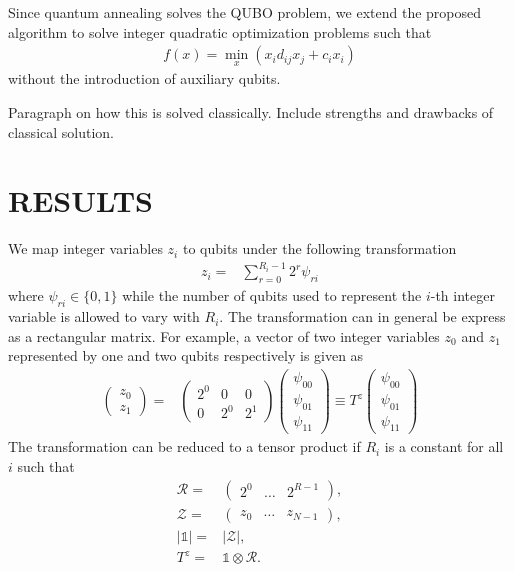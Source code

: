 \documentclass[fleqn,10pt]{wlscirep}
\begin{document}
Since quantum annealing solves the QUBO problem, we extend the proposed algorithm to solve integer quadratic optimization problems such that
\begin{align}
f(x) = \min\limits_{x}(x_i d_{ij} x_j + c_i x_i)
\end{align}
without the introduction of auxiliary qubits.

{\color{red} Paragraph on how this is solved classically. Include strengths and drawbacks of classical solution.}

\section{RESULTS}
\label{sec:results}
We map integer variables $z_i$ to qubits under the following transformation~\cite{Chang:2018uoc}
\begin{align}
z_i = & \sum_{r=0}^{R_i-1} 2^r \psi_{ri}
\label{eq:int_to_bin}
\end{align}
where $\psi_{ri} \in \{0, 1\}$ while the number of qubits used to represent the $i$-th integer variable is allowed to vary with $R_i$. The transformation can in general be express as a rectangular matrix. For example, a vector of two integer variables $z_0$ and $z_1$ represented by one and two qubits respectively is given as
\begin{align}
\begin{pmatrix}
z_0\\
z_1
\end{pmatrix}
= &
\begin{pmatrix}
2^0 & 0 & 0\\
0 & 2^0 & 2^1
\end{pmatrix}
\begin{pmatrix}
\psi_{00}\\
\psi_{01}\\
\psi_{11}
\end{pmatrix}
\equiv T^z \begin{pmatrix}
\psi_{00}\\
\psi_{01}\\
\psi_{11}
\end{pmatrix}
\end{align}
The transformation can be reduced to a tensor product if $R_i$ is a constant for all $i$ such that
\begin{align}
\mathcal{R} = & \begin{pmatrix} 2^0 & \dots & 2^{R-1}\end{pmatrix},\\
\mathcal{Z} = & \begin{pmatrix} z_0 & \dots & z_{N-1}\end{pmatrix},\\
|\mathds{1}| = & |\mathcal{Z}|,\\
T^z = & \mathds{1}\otimes \mathcal{R}.
\end{align}
\end{document}
